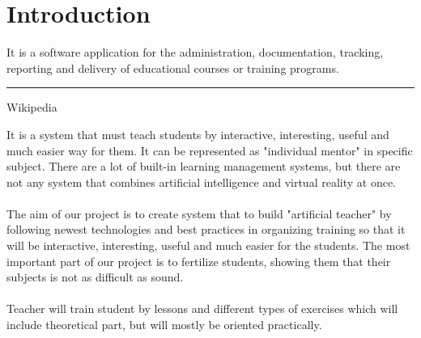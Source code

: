 \documentclass[a4paper, 12pt]{article}
\newenvironment{myblock}[1]{%
	\tcolorbox[beamer,%
	noparskip,breakable,
	colback=LightGreen,colframe=DarkGreen,%
	colbacklower=LimeGreen!75!LightGreen,%
	title=#1]}%
{\endtcolorbox}
\begin{document}
	\section{Introduction}
	
	\vspace{1cm}
	\large{
		\begin{myblock}{"Learning management system"}
			It is a software application for the administration, documentation, tracking, reporting and delivery of educational courses or training programs.
			\rule{\textwidth}{0.4pt}
			{
				\begin{flushright}
					{\Large Wikipedia}
				\end{flushright}
			}
		\end{myblock}
		\vspace{1cm}
		\begin{myblock}{"Artificial teacher"}
			It is a system that must teach students by interactive, interesting, useful and much easier way for them. It can be represented as "individual mentor" in specific subject.
		\end{myblock}
		\vspace{1cm}
		There are a lot of built-in learning management systems, but there are not any system that combines artificial intelligence and virtual reality at once. \\
		\\
		The aim of our project is to create system that to build "artificial teacher" by following newest technologies and best practices in organizing training so that it will be interactive, interesting, useful and much easier for the students. The most important part of our project is to fertilize students, showing them that their subjects is not as difficult as sound.\\
		\\		
		Teacher will train student by lessons and different types of exercises which will include theoretical part, but will mostly be oriented practically. 
	}
\end{document}
